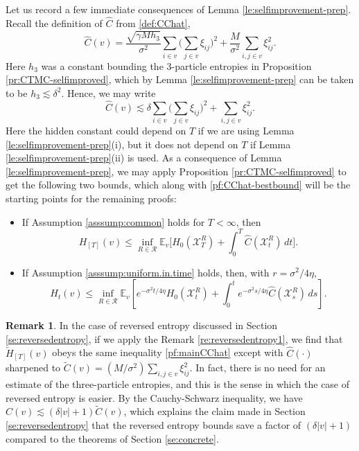 \documentclass[11pt,reqno]{amsart}
\numberwithin{equation}{section}
\theoremstyle{definition}
\newtheorem{remark}[theorem]{Remark}
\def\CC{{C}}
\def\E{{\mathbb E}}
\def\X{{\mathcal X}}
\begin{document}
Let us record a few immediate consequences of Lemma \ref{le:selfimprovement-prep}.
Recall the definition of  $\widehat{\CC}$ from \eqref{def:CChat},
\begin{equation*}
\widehat{\CC}(v) = \frac{ \sqrt{\gamma M h_3}}{\sigma^2} \sum_{i \in v}\bigg(\sum_{j \in v}\xi_{ij}\bigg)^2 + \frac{M}{\sigma^2} \sum_{i,j \in v} \xi_{ij}^2.
\end{equation*}
Here $h_3$ was a constant bounding the 3-particle entropies in Proposition \ref{pr:CTMC-selfimproved}, which by Lemma \ref{le:selfimprovement-prep} can be taken to be $h_3 \lesssim \delta^2$. Hence, we may write
\begin{equation}
\widehat{\CC}(v) \lesssim \delta \sum_{i \in v}\bigg(\sum_{j \in v}\xi_{ij}\bigg)^2 +   \sum_{i,j \in v} \xi_{ij}^2. \label{pf:CChat-bestbound}
\end{equation}
Here the hidden constant could depend on $T$ if we are using Lemma \ref{le:selfimprovement-prep}(i), but it does not depend on $T$ if Lemma \ref{le:selfimprovement-prep}(ii) is used. As a consequence of Lemma \ref{le:selfimprovement-prep}, we may apply Proposition \ref{pr:CTMC-selfimproved} to get the following two bounds, which along with \eqref{pf:CChat-bestbound} will be the starting points for the remaining proofs:
\begin{itemize}
\item If Assumption \ref{asssump:common} holds for $T < \infty$, then
\begin{equation}
	H_{[T]}(v) \le\inf_{R \in \mathcal{R}}\E_v\bigg[H_0(\X^{R}_T) + \int_0^T \widehat{\CC}(\X^{R}_t)\, dt\bigg]. \label{pf:mainCChat}
\end{equation}
\item If Assumption \ref{asssump:uniform.in.time} holds, then, with $r=\sigma^2/4\eta$,
	\begin{equation} 
	H_t(v)  \le \inf_{R \in \mathcal{R}} \E_v \left[ e^{-\sigma^2t/4\eta} H_0(\X^{R}_t) + \int_0^t e^{-\sigma^2s/4\eta } \widehat{\CC}(\X^{R}_s) \, ds\right]. \label{pf:mainCChat.uit}
\end{equation} 
\end{itemize}

\begin{remark} \label{re:reversedentropy2}
In the case of reversed entropy discussed in Section \ref{se:reversedentropy}, if we apply the Remark \ref{re:reversedentropy1}, we find that $\overleftarrow{H}_{[T]}(v)$ obeys the same inequality \eqref{pf:mainCChat} except with $\widehat{C}(\cdot)$ sharpened to $\widetilde{C}(v) = (M/\sigma^2)\sum_{i,j\in v}\xi_{ij}^2$. In fact, there is no need for an estimate of the three-particle entropies, and this is the sense in which the case of reversed entropy is easier. By the Cauchy-Schwarz inequality, we have $\widehat{C}(v) \lesssim (\delta|v|+1)\widetilde{C}(v)$, which explains the claim made in Section \ref{se:reversedentropy} that the reversed entropy bounds save a factor of $(\delta|v|+1)$ compared to the theorems of Section \ref{se:concrete}.
\end{remark}
\end{document}
